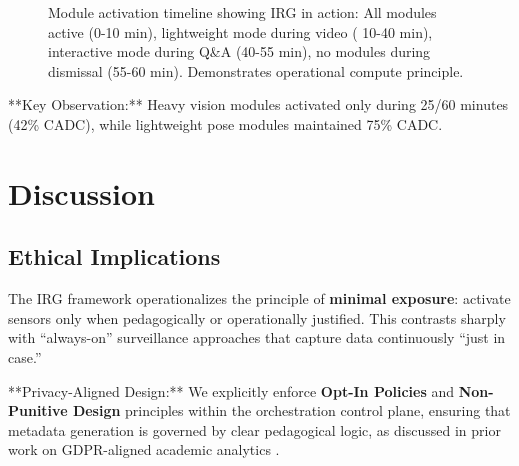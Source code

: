 \documentclass[conference]{IEEEtran}
\begin{document}
\begin{figure}[htbp]
\centering
{}

\caption{Module activation timeline showing IRG in action: All modules active (0-10 min), lightweight mode during video ( 10-40 min), interactive mode during Q\&A (40-55 min), no modules during dismissal (55-60 min). Demonstrates operational compute principle.}
\label{fig:timeline}
\end{figure}

**Key Observation:** Heavy vision modules activated only during 25/60 minutes (42\% CADC), while lightweight pose modules maintained 75\% CADC.

\section{Discussion}

\subsection{Ethical Implications}
The IRG framework operationalizes the principle of \textbf{minimal exposure}: activate sensors only when pedagogically or operationally justified. This contrasts sharply with ``always-on'' surveillance approaches that capture data continuously ``just in case.''

**Privacy-Aligned Design:** We explicitly enforce \textbf{Opt-In Policies} and \textbf{Non-Punitive Design} principles within the orchestration control plane, ensuring that metadata generation is governed by clear pedagogical logic, as discussed in prior work on GDPR-aligned academic analytics \cite{b4}.
\end{document}
